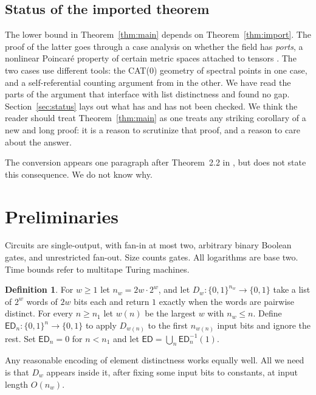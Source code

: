 \documentclass[11pt]{article}
\theoremstyle{definition}
\newtheorem{definition}[theorem]{Definition}
\theoremstyle{remark}
\newcommand{\ED}{\mathsf{ED}}
\begin{document}
\subsection{Status of the imported theorem}
The lower bound in Theorem~\ref{thm:main} depends on
Theorem~\ref{thm:import}. The proof of the latter goes through a case
analysis on whether the field has \emph{ports}, a nonlinear Poincar\'e
property of certain metric spaces attached to tensors \cite{Geom}. The
two cases use different tools: the CAT(0) geometry of spectral points in
one case, and a self-referential counting argument from \cite{HC} in the
other. We have read the parts of the argument that interface with list
distinctness and found no gap. Section~\ref{sec:status} lays out what has
and has not been checked. We think the reader should treat
Theorem~\ref{thm:main} as one treats any striking corollary of a new and
long proof: it is a reason to scrutinize that proof, and a reason to care
about the answer.

The conversion appears one paragraph after Theorem~2.2 in \cite{OAI}, but
\cite{OAI} does not state this consequence. We do not know why.

\section{Preliminaries}\label{sec:prelim}
Circuits are single-output, with fan-in at most two, arbitrary binary
Boolean gates, and unrestricted fan-out. Size counts gates. All
logarithms are base two. Time bounds refer to multitape Turing machines.

\begin{definition}\label{def:ed}
For $w\ge1$ let $n_w=2w\cdot2^w$, and let $D_w:\{0,1\}^{n_w}\to\{0,1\}$
take a list of $2^w$ words of $2w$ bits each and return $1$ exactly when
the words are pairwise distinct. For every $n\ge n_1$ let $w(n)$ be the
largest $w$ with $n_w\le n$. Define $\ED_n:\{0,1\}^n\to\{0,1\}$ to apply
$D_{w(n)}$ to the first $n_{w(n)}$ input bits and ignore the rest.
Set $\ED_n=0$ for $n<n_1$ and let $\ED=\bigcup_n\ED_n^{-1}(1)$.
\end{definition}

Any reasonable encoding of element distinctness works equally well. All
we need is that $D_w$ appears inside it, after fixing some input bits to
constants, at input length $O(n_w)$.
\end{document}
